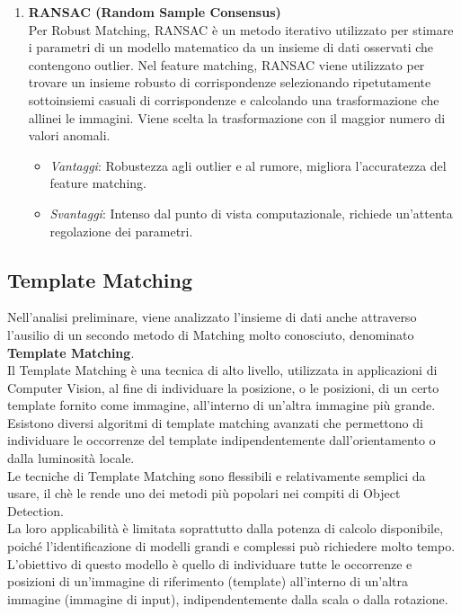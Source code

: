 \documentclass[12pt,a4paper,openright,twoside]{book}
\begin{document}
\begin{enumerate}
\item \textbf{RANSAC (Random Sample Consensus)}\\
Per Robust Matching, RANSAC è un metodo iterativo utilizzato per stimare i parametri di un modello matematico da un insieme di dati osservati che contengono outlier. Nel feature matching, RANSAC viene utilizzato per trovare un insieme robusto di corrispondenze selezionando ripetutamente sottoinsiemi casuali di corrispondenze e calcolando una trasformazione che allinei le immagini. Viene scelta la trasformazione con il maggior numero di valori anomali.
\begin{itemize}
\item {\itshape Vantaggi}: Robustezza agli outlier e al rumore, migliora l'accuratezza del feature matching.
\item {\itshape Svantaggi}:  Intenso dal punto di vista computazionale, richiede un'attenta regolazione dei parametri.
\end{itemize}

\end{enumerate}

\subsection{Template Matching}
Nell'analisi preliminare, viene analizzato l'insieme di dati anche attraverso l'ausilio di un secondo metodo di Matching molto conosciuto, denominato \textbf{Template Matching}.\\
Il Template Matching è una tecnica di alto livello, utilizzata in applicazioni di Computer Vision, al fine di individuare la posizione, o le posizioni, di un certo template fornito come immagine, all'interno di un'altra immagine più grande.\\
Esistono diversi algoritmi di template matching avanzati che permettono di individuare le occorrenze del template indipendentemente dall'orientamento o dalla luminosità locale.\\
Le tecniche di Template Matching sono flessibili e relativamente semplici da usare, il chè le rende uno dei metodi più popolari nei compiti di Object Detection.\\
La loro applicabilità è limitata soprattutto dalla potenza di calcolo disponibile, poiché l'identificazione di modelli grandi e complessi può richiedere molto tempo.\\

L'obiettivo di questo modello è quello di individuare tutte le occorrenze e posizioni di un'immagine di riferimento (template) all'interno di un'altra immagine (immagine di input), indipendentemente dalla scala o dalla rotazione.\\
\end{document}
